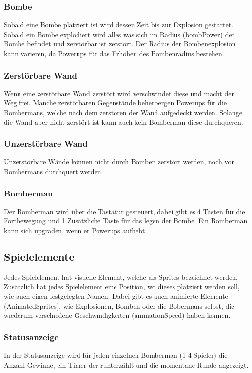 \documentclass[11pt]{scrartcl}
\begin{document}
\subsubsection{Bombe}
\label{sec:Bombe}
Sobald eine Bombe platziert ist wird dessen \grqq{}Zeit bis zur Explosion gestartet\grqq{}.
Sobald ein Bombe explodiert wird alles was sich im Radius (bombPower) der Bombe befindet und zerstörbar ist zerstört.
Der Radius der Bombenexplosion kann varieren, da Powerups für das Erhöhen des Bombenradius bestehen.
\subsubsection{Zerstörbare Wand}
\label{sec:Zerstörbare Wand (DestroyableBlock)}
Wenn eine zerstörbare Wand zerstört wird verschwindet diese und macht den Weg frei.
Manche zerstörbaren Gegenstände beherbergen Powerups für die Bombermans, welche nach dem zerstören der Wand aufgedeckt werden.
Solange die Wand aber nicht zerstört ist kann auch kein Bomberman diese durchqueren.

\subsubsection{Unzerstörbare Wand}
\label{sec:Unzerstörbare Wand}
Unzerstörbare Wände können nicht durch Bomben zerstört werden, noch von Bombermans durchquert werden.

\subsubsection{Bomberman}
\label{sec:Bomberman}
Der Bomberman wird über die Tastatur gesteuert, dabei gibt es 4 Tasten für die Fortbewegung und 1 Zusätzliche Taste für das legen der Bombe.
Ein Bomberman kann sich \grqq{}upgraden\grqq{}, wenn er Powerups aufhebt.

\subsection{Spielelemente}
\label{sec:Spielelemente}
Jedes Spielelement hat visuelle Element, welche als Sprites bezeichnet werden.
Zusätzlich hat jedes Spielelement eine Position, wo dieses platziert werden soll, wie auch einen festgelegten Namen.
Dabei gibt es auch animierte Elemente (AnimatedSprites), wie Explosionen, Bomben oder die Bobermans selbst, die wiederum verschiedene Geschwindigkeiten (animationSpeed) haben können.
\subsubsection{Statusanzeige}
\label{sec:Statusanzeige}
In der Statusanzeige wird für jeden einzelnen Bomberman (1-4 Spieler) die Anzahl 
Gewinne, ein Timer der runterzählt und die momentane Runde angezeigt.
\end{document}
